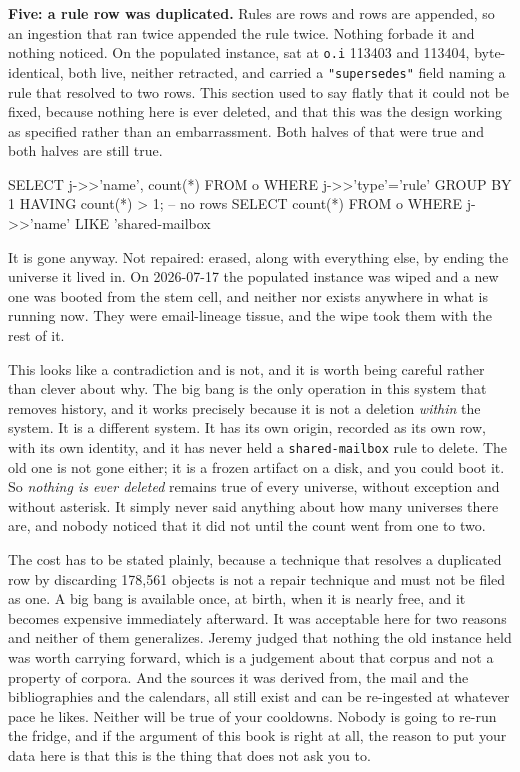 \textbf{Five: a rule row was duplicated.} Rules are rows and rows are appended, so an ingestion that ran twice appended the rule twice. Nothing forbade it and nothing noticed. On the populated instance,  sat at \texttt{o.i} 113403 and 113404, byte-identical, both live, neither retracted, and  carried a \texttt{"supersedes"} field naming a rule that resolved to two rows. This section used to say flatly that it could not be fixed, because nothing here is ever deleted, and that this was the design working as specified rather than an embarrassment. Both halves of that were true and both halves are still true.

\begin{Check}
SELECT j->>'name', count(*) FROM o WHERE j->>'type'='rule'
 GROUP BY 1 HAVING count(*) > 1;   -- no rows
SELECT count(*) FROM o WHERE j->>'name' LIKE 'shared-mailbox%
\end{Check}

It is gone anyway. Not repaired: erased, along with everything else, by ending the universe it lived in. On 2026-07-17 the populated instance was wiped and a new one was booted from the stem cell, and neither  nor  exists anywhere in what is running now. They were email-lineage tissue, and the wipe took them with the rest of it.

This looks like a contradiction and is not, and it is worth being careful rather than clever about why. The big bang is the only operation in this system that removes history, and it works precisely because it is not a deletion \emph{within} the system. It is a different system. It has its own origin, recorded as its own row, with its own identity, and it has never held a \texttt{shared-mailbox} rule to delete. The old one is not gone either; it is a frozen artifact on a disk, and you could boot it. So \textit{nothing is ever deleted} remains true of every universe, without exception and without asterisk. It simply never said anything about how many universes there are, and nobody noticed that it did not until the count went from one to two.

The cost has to be stated plainly, because a technique that resolves a duplicated row by discarding 178,561 objects is not a repair technique and must not be filed as one. A big bang is available once, at birth, when it is nearly free, and it becomes expensive immediately afterward. It was acceptable here for two reasons and neither of them generalizes. Jeremy judged that nothing the old instance held was worth carrying forward, which is a judgement about that corpus and not a property of corpora. And the sources it was derived from, the mail and the bibliographies and the calendars, all still exist and can be re-ingested at whatever pace he likes. Neither will be true of your cooldowns. Nobody is going to re-run the fridge, and if the argument of this book is right at all, the reason to put your data here is that this is the thing that does not ask you to.


